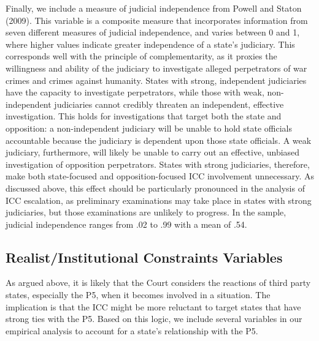 Finally, we include a measure of judicial independence from Powell and Staton (2009).  This variable is a composite measure that incorporates information from seven different measures of judicial independence, and varies between 0 and 1, where higher values indicate greater independence of a state’s judiciary.  This corresponds well with the principle of complementarity, as it proxies the willingness and ability of the judiciary to investigate alleged perpetrators of war crimes and crimes against humanity. States with strong, independent judiciaries have the capacity to investigate perpetrators, while those with weak, non-independent judiciaries cannot credibly threaten an independent, effective investigation.  This holds for investigations that target both the state and opposition: a non-independent judiciary will be unable to hold state officials accountable because the judiciary is dependent upon those state officials.  A weak judiciary, furthermore, will likely be unable to carry out an effective, unbiased investigation of opposition perpetrators.  States with strong judiciaries, therefore, make both state-focused and opposition-focused ICC involvement unnecessary.  As discussed above, this effect should be particularly pronounced in the analysis of ICC escalation, as preliminary examinations may take place in states with strong judiciaries, but those examinations are unlikely to progress.  In the sample, judicial independence ranges from .02 to .99 with a mean of .54.

\subsection*{Realist/Institutional Constraints Variables}

As argued above, it is likely that the Court considers the reactions of third party states, especially the P5, when it becomes involved in a situation.  The implication is that the ICC might be more reluctant to target states that have strong ties with the P5.  Based on this logic, we include several variables in our empirical analysis to account for a state’s relationship with the P5. 

